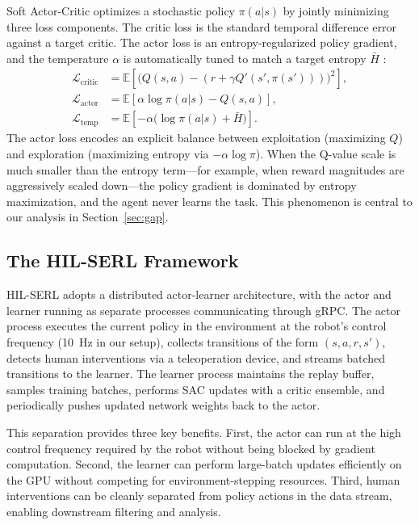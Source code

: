 \documentclass[12pt,a4paper]{article}
\begin{document}
Soft Actor-Critic optimizes a stochastic policy $\pi(a|s)$ by jointly minimizing three loss components. The critic loss is the standard temporal difference error against a target critic. The actor loss is an entropy-regularized policy gradient, and the temperature $\alpha$ is automatically tuned to match a target entropy $\bar{H}$ \citep{haarnoja2018soft}:
\begin{align}
\mathcal{L}_{\mathrm{critic}} &= \mathbb{E}\left[ \bigl( Q(s, a) - (r + \gamma Q'(s', \pi(s'))) \bigr)^2 \right], \\
\mathcal{L}_{\mathrm{actor}} &= \mathbb{E}\left[ \alpha \log \pi(a|s) - Q(s, a) \right], \\
\mathcal{L}_{\mathrm{temp}} &= \mathbb{E}\left[ -\alpha \bigl( \log \pi(a|s) + \bar{H} \bigr) \right].
\end{align}
The actor loss encodes an explicit balance between exploitation (maximizing $Q$) and exploration (maximizing entropy via $-\alpha \log \pi$). When the Q-value scale is much smaller than the entropy term---for example, when reward magnitudes are aggressively scaled down---the policy gradient is dominated by entropy maximization, and the agent never learns the task. This phenomenon is central to our analysis in Section~\ref{sec:gap}.

\subsection{The HIL-SERL Framework}

HIL-SERL \citep{luo2024serl} adopts a distributed actor-learner architecture, with the actor and learner running as separate processes communicating through gRPC. The actor process executes the current policy in the environment at the robot's control frequency (10~Hz in our setup), collects transitions of the form $(s, a, r, s')$, detects human interventions via a teleoperation device, and streams batched transitions to the learner. The learner process maintains the replay buffer, samples training batches, performs SAC updates with a critic ensemble, and periodically pushes updated network weights back to the actor.

This separation provides three key benefits. First, the actor can run at the high control frequency required by the robot without being blocked by gradient computation. Second, the learner can perform large-batch updates efficiently on the GPU without competing for environment-stepping resources. Third, human interventions can be cleanly separated from policy actions in the data stream, enabling downstream filtering and analysis.
\end{document}
